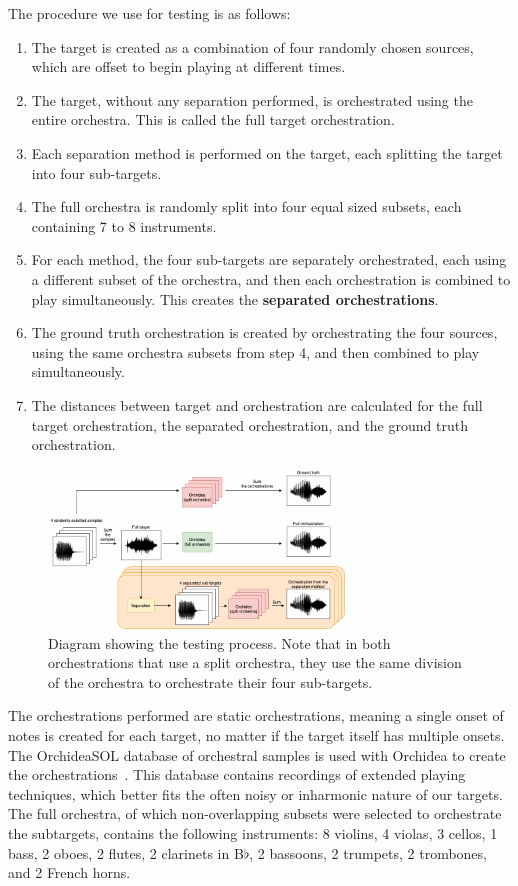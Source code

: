 \documentclass{article}
\begin{document}
    The procedure we use for testing is as follows:
    \begin{enumerate}
      \item The target is created as a combination of four randomly chosen sources, which are offset to begin playing at different times.
      \item The target, without any separation performed, is orchestrated using the entire orchestra. This is called the full target orchestration.
      \item Each separation method is performed on the target, each splitting the target into four sub-targets. 
      \item The full orchestra is randomly split into four equal sized subsets, each containing 7 to 8 instruments.
      \item For each method, the four sub-targets are separately orchestrated, each using a different subset of the orchestra, and then each orchestration is combined to play simultaneously. This creates the \textbf{separated orchestrations}.
      \item The ground truth orchestration is created by orchestrating the four sources, using the same orchestra subsets from step 4, and then combined to play simultaneously.
      \item The distances between target and orchestration are calculated for the full target orchestration, the separated orchestration, and the ground truth orchestration. 
    \end{enumerate} 

    \begin{figure}[t]
      \centering
        \includegraphics[width=0.7\textwidth]{figures/evaluation_diagram.png}
        \caption{Diagram showing the testing process. Note that in both orchestrations that use a split orchestra, they use the same division of the orchestra to orchestrate their four sub-targets.}\label{fig:eval_diagram}
    \end{figure}
    
    The orchestrations performed are static orchestrations, meaning a single onset of notes is created for each target, no matter if the target itself has multiple onsets. The OrchideaSOL database of orchestral samples is used with Orchidea to create the orchestrations~\cite{Cella2020c}. This database contains recordings of extended playing techniques, which better fits the often noisy or inharmonic nature of our targets. The full orchestra, of which non-overlapping subsets were selected to orchestrate the subtargets, contains the following instruments: 8 violins, 4 violas, 3 cellos, 1 bass, 2 oboes, 2 flutes, 2 clarinets in B$\flat$, 2 bassoons, 2 trumpets, 2 trombones, and 2 French horns.
    
\end{document}
